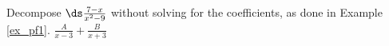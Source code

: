 {Decompose $\ds \frac{7-x}{x^2-9}$ without solving for the coefficients, as done in Example \ref{ex_pf1}.}
{$\frac{A}{x-3} + \frac{B}{x+3}$}
